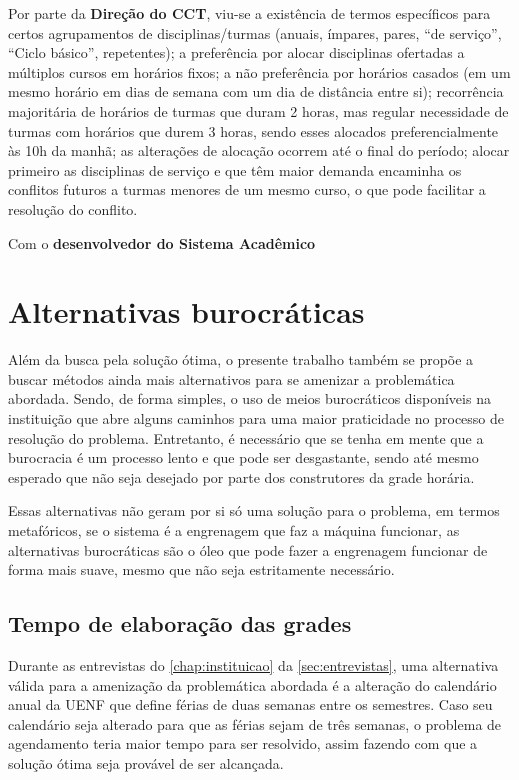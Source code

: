 Por parte da \textbf{Direção do CCT}, viu-se a existência de termos específicos para certos agrupamentos de disciplinas/turmas (anuais, ímpares, pares, ``de serviço'', ``Ciclo básico'', repetentes); a preferência por alocar disciplinas ofertadas a múltiplos cursos em horários fixos; a não preferência por horários casados (em um mesmo horário em dias de semana com um dia de distância entre si); recorrência majoritária de horários de turmas que duram 2 horas, mas regular necessidade de turmas com horários que durem 3 horas, sendo esses alocados preferencialmente às 10h da manhã; as alterações de alocação ocorrem até o final do período; alocar primeiro as disciplinas de serviço e que têm maior demanda encaminha os conflitos futuros a turmas menores de um mesmo curso, o que pode facilitar a resolução do conflito.

Com o \textbf{desenvolvedor do Sistema Acadêmico}

\section{Alternativas burocráticas} %

Além da busca pela solução ótima, o presente trabalho também se propõe a buscar métodos ainda mais alternativos para se amenizar a problemática abordada. Sendo, de forma simples, o uso de meios burocráticos disponíveis na instituição que abre alguns caminhos para uma maior praticidade no processo de resolução do problema. Entretanto, é necessário que se tenha em mente que a burocracia é um processo lento e que pode ser desgastante, sendo até mesmo esperado que não seja desejado por parte dos construtores da grade horária.

Essas alternativas não geram por si só uma solução para o problema, em termos metafóricos, se o sistema é a engrenagem que faz a máquina funcionar, as alternativas burocráticas são o óleo que pode fazer a engrenagem funcionar de forma mais suave, mesmo que não seja estritamente necessário.

\subsection{Tempo de elaboração das grades} \label{ssec:burocracia-férias} %

Durante as entrevistas do \autoref{chap:instituicao} da \autoref{sec:entrevistas}, uma alternativa válida para a amenização da problemática abordada é a alteração do calendário anual da UENF que define férias de duas semanas entre os semestres. Caso seu calendário seja alterado para que as férias sejam de três semanas, o problema de agendamento teria maior tempo para ser resolvido, assim fazendo com que a solução ótima seja provável de ser alcançada.

